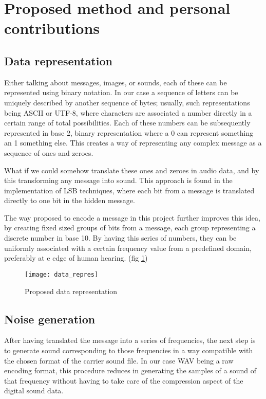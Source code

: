 \documentclass[12pt]{report}
\begin{document}
\section{Proposed method and personal contributions}
\subsection{Data representation}
Either talking about messages, images, or sounds, each of these can be represented using binary notation. In our case a sequence of letters can be uniquely described by another sequence of bytes; usually, such representations being ASCII or UTF-8, where characters are associated a number directly in a certain range of total possibilities. Each of these numbers can be subsequently represented in base 2, binary representation where a 0 can represent something an 1 something else. This creates a way of representing any complex message as a sequence of ones and zeroes.

What if we could somehow translate these ones and zeroes in audio data, and by this transforming any message into sound. This approach is found in the implementation of LSB techniques, where each bit from a message is translated directly to one bit in the hidden message. 

The way proposed to encode a message in this project further improves this idea, by creating fixed sized groups of bits from a message, each group representing a discrete number in base 10. By having this series of numbers, they can be uniformly associated with a certain frequency value from a predefined domain, preferably at e edge of human hearing.
(fig \ref{fig:data_representation})

\begin{figure}[h]
\centering
\texttt{[image: data\_repres]}
\caption{Proposed data representation}
\label{fig:data_representation}
\end{figure}


\subsection{Noise generation}

After having translated the message into a series of frequencies, the next step is to generate sound corresponding to those frequencies in a way compatible with the chosen format of the carrier sound file. In our case WAV being a raw encoding format, this procedure reduces in generating the samples of a sound of that frequency without having to take care of the compression aspect of the digital sound data.
\end{document}
